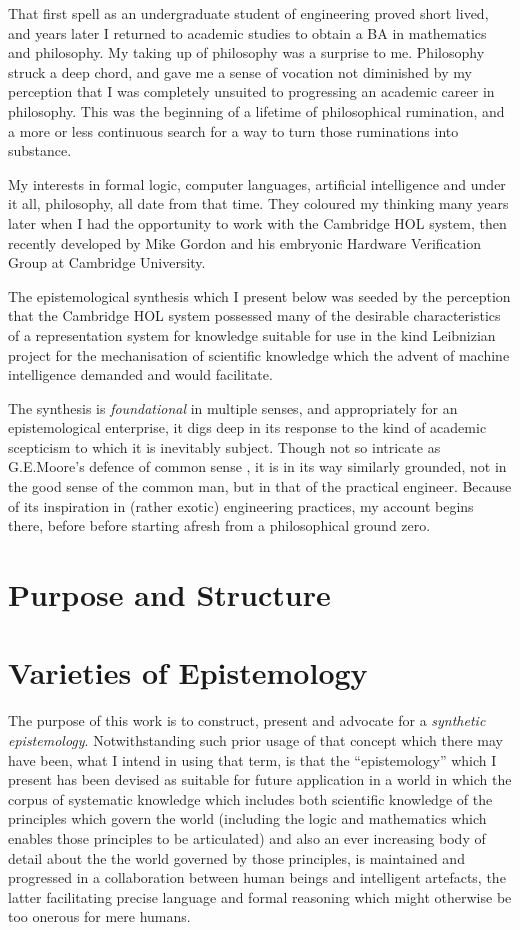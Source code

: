 \documentclass[10pt,titlepage]{book}
\begin{document}
That first spell as an undergraduate student of engineering proved short lived, and years later I returned to academic studies to obtain a BA in mathematics and philosophy.
My taking up of philosophy was a surprise to me.
Philosophy struck a deep chord, and gave me a sense of vocation not diminished by my perception that I was completely unsuited to progressing an academic career in philosophy.
This was the beginning of a lifetime of philosophical rumination, and a more or less continuous search for a way to turn those ruminations into substance.

My interests in formal logic, computer languages, artificial intelligence and under it all, philosophy, all date from that time.
They coloured my thinking many years later when I had the opportunity to work with the Cambridge HOL system, then recently developed by Mike Gordon and his embryonic Hardware Verification Group at Cambridge University.

The epistemological synthesis which I present below was seeded by the perception that the Cambridge HOL system possessed many of the desirable characteristics of a representation system for knowledge suitable for use in the kind Leibnizian project for the mechanisation of scientific knowledge which the advent of machine intelligence demanded and would facilitate.

The synthesis is \emph{foundational} in multiple senses, and appropriately for an epistemological enterprise, it digs deep in its response to the kind of academic scepticism to which it is inevitably subject.
Though not so intricate as G.E.Moore's defence of common sense \cite{moore1925,moore1993}, it is in its way similarly grounded, not in the good sense of the common man, but in that of the practical engineer.
Because of its inspiration in (rather exotic) engineering practices, my account begins there, before before starting afresh from a philosophical ground zero.
\section{Purpose and Structure}

\section{Varieties of Epistemology}

The purpose of this work is to construct, present and advocate for a \emph{synthetic epistemology}.
Notwithstanding such prior usage of that concept which there may have been, what I intend in using that term, is that the ``epistemology'' which I present has been devised as suitable for future application in a world in which the corpus of systematic knowledge which includes both scientific knowledge of the principles which govern the world (including the logic and mathematics which enables those principles to be articulated) and also an ever increasing body of detail about the the world governed by those principles, is maintained and progressed in a collaboration between human beings and intelligent artefacts, the latter facilitating precise language and formal reasoning which might otherwise be too onerous for mere humans.
\end{document}
